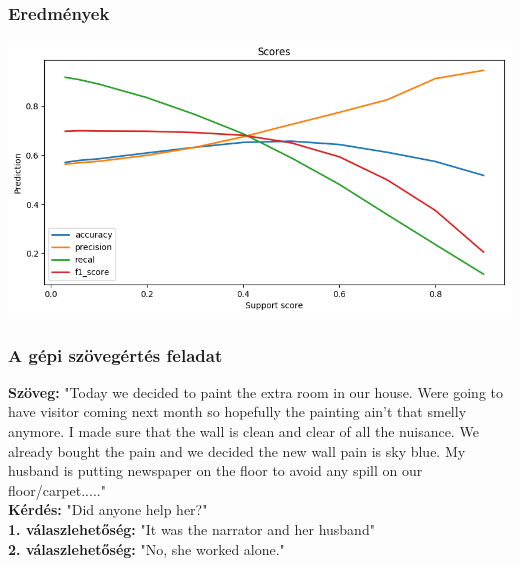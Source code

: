 \documentclass[bigger]{beamer}
\begin{document}
\begin{frame}
\frametitle{Eredmények}
 \centering
 \includegraphics[scale=0.5]{pics/nliexpanded.png}
\end{frame}

\begin{frame}
	\frametitle{A gépi szövegértés feladat \citep{Chen:2018, Wang:2018}}
	\textbf{Sz\"oveg:} "Today we decided to paint the extra room in our house. Were going to have visitor coming next month so hopefully the painting ain't that smelly anymore. I made sure that the wall is clean and clear of all the nuisance. We already bought the pain and we decided the new wall pain is sky blue. My husband is putting newspaper on the floor to avoid any spill on our floor/carpet....." \\
	\textbf{Kérdés:} "Did anyone help her?" \\
	\textbf{1. v\'alaszlehet\H{o}s\'eg:} "It was the narrator and her husband" \\
	\textbf{2. v\'alaszlehet\H{o}s\'eg:} "No, she worked alone."
\end{frame}

\end{document}
